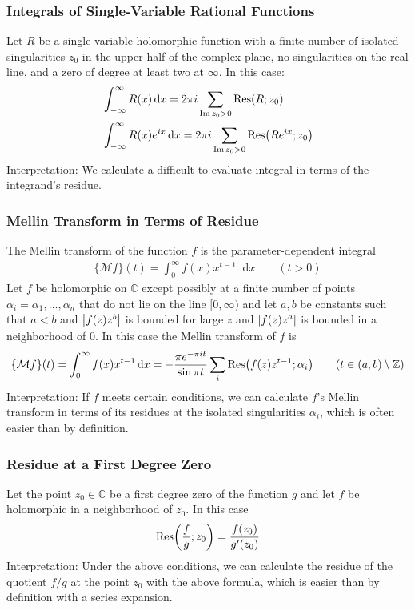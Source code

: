 \documentclass[11pt, a4paper]{article}
\newcommand{\diff}{\mathop{}\!\mathrm{d}} %
\newcommand{\C}{\mathbb{C}} %
\begin{document}
\subsubsection{Integrals of Single-Variable Rational Functions}
Let $ R $ be a single-variable holomorphic function with a finite number of isolated singularities $ z_0 $ in the upper half of the complex plane, no singularities on the real line, and a zero of degree at least two at $ \infty $. In this case:
\begin{align*}
	&\int_{-\infty}^{\infty}R(x) \diff x = 2\pi i\sum_{\operatorname{Im} z_0 > 0} \Res(R;z_0)\\
	&\int_{-\infty}^{\infty}R(x)e^{ix} \diff x = 2\pi i\sum_{\operatorname{Im} z_0 > 0} \Res(Re^{ix};z_0)
\end{align*}
Interpretation: We calculate a difficult-to-evaluate integral in terms of the integrand's residue.


\subsubsection{Mellin Transform in Terms of Residue}
The Mellin transform of the function $ f $ is the parameter-dependent integral
\begin{align*}
	\{\mathcal{M}f \}(t) =  \int_{0}^{\infty}f(x)x^{t-1}\diff x \qquad (t > 0)
\end{align*}
Let $ f $ be holomorphic on $ \C $ except possibly at a finite number of points $ \alpha_{i} = \alpha_1, \dots, \alpha_n$ that do not lie on the line $ [0, \infty) $ and let $ a, b $ be constants such that $ a < b $ and $ \abs{f(z)z^b} $ is bounded for large $ z $ and $ \abs{f(z)z^a} $ is bounded in a neighborhood of $ 0 $. In this case the Mellin transform of $ f $ is
\begin{align*}
	\{\mathcal{M}f \}(t) = \int_{0}^{\infty}f(x)x^{t-1}\diff x = -\frac{\pi e^{-\pi i t}}{\sin \pi t} \sum_{i} \Res(f(z)z^{t-1}; \alpha_{i}) \qquad (t \in (a, b) \setminus \mathbb{Z})
\end{align*}
Interpretation: If $ f $ meets certain conditions, we can calculate $ f $'s Mellin transform in terms of its residues at the isolated singularities $ \alpha_i $, which is often easier than by definition.

\subsubsection{Residue at a First Degree Zero}
Let the point $ z_0 \in \C $ be a first degree zero of the function $ g $ and let $ f $ be holomorphic in a neighborhood of $ z_0 $. In this case
\begin{align*}
	\Res(\frac{f}{g}; z_0) = \frac{f(z_0)}{g'(z_0)}
\end{align*}
Interpretation: Under the above conditions, we can calculate the residue of the quotient $ f/g $ at the point $ z_0 $ with the above formula, which is easier than by definition with a series expansion.
\end{document}
